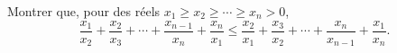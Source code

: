 Montrer que, pour des réels $x_1 \geq x_2 \geq \cdots \geq x_n > 0$,
\[ \frac{x_1}{x_2} + \frac{x_2}{x_3} + \cdots + \frac{x_{n-1}}{x_n} + \frac{x_n}{x_1} \leq \frac{x_2}{x_1} + \frac{x_3}{x_2} + \cdots + \frac{x_n}{x_{n-1}} + \frac{x_1}{x_n}. \]
